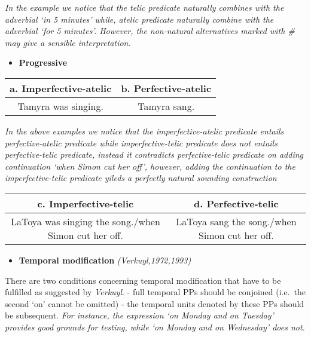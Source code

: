 \documentclass[11pt]{article}
\providecommand{\tightlist}{%
      \setlength{\itemsep}{0pt}\setlength{\parskip}{0pt}}
\begin{document}
\emph{In the example we notice that the telic predicate naturally
combines with the adverbial `in 5 minutes' while, atelic predicate
naturally combine with the adverbial `for 5 minutes'. However, the
non-natural alternatives marked with \# may give a sensible
interpretation.}

    \begin{itemize}
\tightlist
\item
  \textbf{Progressive}
\end{itemize}

\begin{longtable}[]{@{}cc@{}}
\toprule
a. Imperfective-atelic & b. Perfective-atelic\tabularnewline
\midrule
\endhead
Tamyra was singing. & Tamyra sang.\tabularnewline
\bottomrule
\end{longtable}

\emph{In the above examples we notice that the imperfective-atelic
predicate entails perfective-atelic predicate while imperfective-telic
predicate does not entails perfective-telic predicate, instead it
contradicts perfective-telic predicate on adding continuation `when
Simon cut her off', however, adding the continuation to the
imperfective-telic predicate yileds a perfectly natural sounding
construction}

    \begin{longtable}[]{@{}cc@{}}
\toprule
\begin{minipage}[b]{0.48\columnwidth}\centering
c. Imperfective-telic\strut
\end{minipage} & \begin{minipage}[b]{0.46\columnwidth}\centering
d. Perfective-telic\strut
\end{minipage}\tabularnewline
\midrule
\endhead
\begin{minipage}[t]{0.48\columnwidth}\centering
LaToya was singing the song./when Simon cut her off.\strut
\end{minipage} & \begin{minipage}[t]{0.46\columnwidth}\centering
LaToya sang the song./when Simon cut her off.\strut
\end{minipage}\tabularnewline
\bottomrule
\end{longtable}

    \begin{itemize}
\tightlist
\item
  \textbf{Temporal modification} \emph{(Verkuyl,1972,1993)}
\end{itemize}

There are two conditions concerning temporal modification that have to
be fulfilled as suggested by \emph{Verkuyl}. - full temporal PPs should
be conjoined (i.e.~the second `on' cannot be omitted) - the temporal
units denoted by these PPs should be subsequent. \emph{For instance, the
expression `on Monday and on Tuesday' provides good grounds for testing,
while `on Monday and on Wednesday' does not.}
\end{document}

